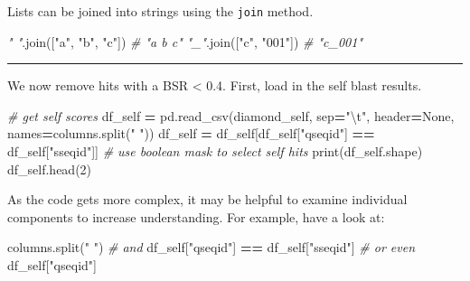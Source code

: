 \documentclass[
]{book}
\newenvironment{Shaded}{\begin{snugshade}}{\end{snugshade}}
\newcommand{\BuiltInTok}[1]{#1}
\newcommand{\CharTok}[1]{\textcolor[rgb]{0.31,0.60,0.02}{#1}}
\newcommand{\CommentTok}[1]{\textcolor[rgb]{0.56,0.35,0.01}{\textit{#1}}}
\newcommand{\DecValTok}[1]{\textcolor[rgb]{0.00,0.00,0.81}{#1}}
\newcommand{\NormalTok}[1]{#1}
\newcommand{\OperatorTok}[1]{\textcolor[rgb]{0.81,0.36,0.00}{\textbf{#1}}}
\newcommand{\StringTok}[1]{\textcolor[rgb]{0.31,0.60,0.02}{#1}}
\newcommand{\VariableTok}[1]{\textcolor[rgb]{0.00,0.00,0.00}{#1}}
\begin{document}
Lists can be joined into strings using the \texttt{join} method.

\begin{Shaded}
\begin{Highlighting}[numbers=left,,]
\CommentTok{" "}\NormalTok{.join([}\StringTok{"a"}\NormalTok{, }\StringTok{"b"}\NormalTok{, }\StringTok{"c"}\NormalTok{]) }\CommentTok{\# "a b c"}
\CommentTok{"\_"}\NormalTok{.join([}\StringTok{"c"}\NormalTok{, }\StringTok{"001"}\NormalTok{]) }\CommentTok{\# "c\_001"}
\end{Highlighting}
\end{Shaded}

\begin{center}\rule{0.5\linewidth}{0.5pt}\end{center}

We now remove hits with a BSR \textless{} 0.4. First, load in the self blast results.

\begin{Shaded}
\begin{Highlighting}[numbers=left,,]
\CommentTok{\# get self scores}
\NormalTok{df\_self }\OperatorTok{=}\NormalTok{ pd.read\_csv(diamond\_self, sep}\OperatorTok{=}\StringTok{"}\CharTok{\textbackslash{}t}\StringTok{"}\NormalTok{, header}\OperatorTok{=}\VariableTok{None}\NormalTok{, names}\OperatorTok{=}\NormalTok{columns.split(}\StringTok{" "}\NormalTok{))}
\NormalTok{df\_self }\OperatorTok{=}\NormalTok{ df\_self[df\_self[}\StringTok{"qseqid"}\NormalTok{] }\OperatorTok{==}\NormalTok{ df\_self[}\StringTok{"sseqid"}\NormalTok{]] }\CommentTok{\# use boolean mask to select self hits}
\BuiltInTok{print}\NormalTok{(df\_self.shape)}
\NormalTok{df\_self.head(}\DecValTok{2}\NormalTok{)}
\end{Highlighting}
\end{Shaded}

As the code gets more complex, it may be helpful to examine individual components to increase understanding.
For example, have a look at:

\begin{Shaded}
\begin{Highlighting}[numbers=left,,]
\NormalTok{columns.split(}\StringTok{" "}\NormalTok{)}
\CommentTok{\# and}
\NormalTok{df\_self[}\StringTok{"qseqid"}\NormalTok{] }\OperatorTok{==}\NormalTok{ df\_self[}\StringTok{"sseqid"}\NormalTok{]}
\CommentTok{\# or even}
\NormalTok{df\_self[}\StringTok{"qseqid"}\NormalTok{]}
\end{Highlighting}
\end{Shaded}
\end{document}
